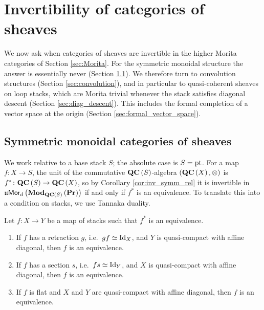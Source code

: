 \section{Invertibility of categories of sheaves}
\label{sec:inv_sheaves}

We now ask when categories of sheaves are invertible in the higher Morita categories of Section
\ref{sec:Morita}. For the symmetric monoidal structure the answer is essentially never (Section
\ref{sec:inv_QC}). We therefore turn to convolution structures (Section \ref{sec:convolution}),
and in particular to quasi-coherent sheaves on loop stacks, which are Morita trivial whenever the
stack satisfies diagonal descent (Section \ref{sec:diag_descent}). This includes the formal
completion of a vector space at the origin (Section \ref{sec:formal_vector_space}).

\subsection{Symmetric monoidal categories of sheaves}
\label{sec:inv_QC}

We work relative to a base stack $S$; the absolute case is $S=\text{pt}$. For a map $f\colon X\to S$,
the unit of the commutative $\mathbf{QC}\left(S\right)$-algebra $\left(\mathbf{QC}\left(X\right),\otimes\right)$ is
$f^*\colon\mathbf{QC}\left(S\right)\to\mathbf{QC}\left(X\right)$, so by Corollary \ref{cor:inv_symm_rel} it is
invertible in $\mathfrak{u}\mathsf{Mor}_d\left(\mathbf{Mod}_{\mathbf{QC}\left(S\right)}\left(\mathbf{Pr}\right)\right)$ if and only if $f^*$ is
an equivalence. To translate this into a condition on stacks, we use Tannaka duality.
\begin{lem}
\label{lem:Tannaka}
Let $f\colon X\to Y$ be a map of stacks such that $f^*$ is an equivalence.
\begin{enumerate}
\item If $f$ has a retraction $g$, i.e.\ $gf\simeq\operatorname{Id}_X$, and $Y$ is quasi-compact with
affine diagonal, then $f$ is an equivalence.
\item If $f$ has a section $s$, i.e.\ $fs\simeq\operatorname{Id}_Y$, and $X$ is quasi-compact with
affine diagonal, then $f$ is an equivalence.
\item If $f$ is flat and $X$ and $Y$ are quasi-compact with affine diagonal, then $f$ is an
equivalence.
\end{enumerate}
\end{lem}

